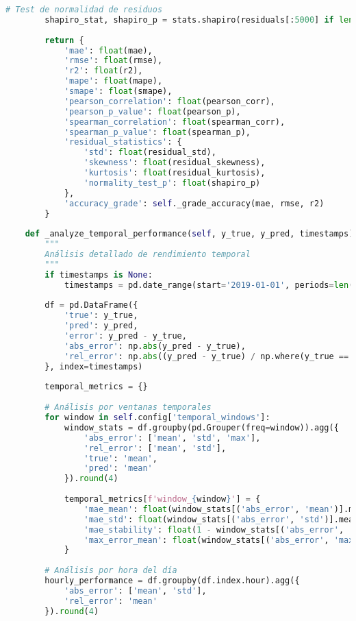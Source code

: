 \begin{lstlisting}[language=Python, caption=Framework integral de evaluación]
        # Test de normalidad de residuos
        shapiro_stat, shapiro_p = stats.shapiro(residuals[:5000] if len(residuals) > 5000 else residuals)
        
        return {
            'mae': float(mae),
            'rmse': float(rmse),
            'r2': float(r2),
            'mape': float(mape),
            'smape': float(smape),
            'pearson_correlation': float(pearson_corr),
            'pearson_p_value': float(pearson_p),
            'spearman_correlation': float(spearman_corr),
            'spearman_p_value': float(spearman_p),
            'residual_statistics': {
                'std': float(residual_std),
                'skewness': float(residual_skewness),
                'kurtosis': float(residual_kurtosis),
                'normality_test_p': float(shapiro_p)
            },
            'accuracy_grade': self._grade_accuracy(mae, rmse, r2)
        }
    
    def _analyze_temporal_performance(self, y_true, y_pred, timestamps):
        """
        Análisis detallado de rendimiento temporal
        """
        if timestamps is None:
            timestamps = pd.date_range(start='2019-01-01', periods=len(y_true), freq='6S')
        
        df = pd.DataFrame({
            'true': y_true,
            'pred': y_pred,
            'error': y_pred - y_true,
            'abs_error': np.abs(y_pred - y_true),
            'rel_error': np.abs((y_pred - y_true) / np.where(y_true == 0, 1, y_true))
        }, index=timestamps)
        
        temporal_metrics = {}
        
        # Análisis por ventanas temporales
        for window in self.config['temporal_windows']:
            window_stats = df.groupby(pd.Grouper(freq=window)).agg({
                'abs_error': ['mean', 'std', 'max'],
                'rel_error': ['mean', 'std'],
                'true': 'mean',
                'pred': 'mean'
            }).round(4)
            
            temporal_metrics[f'window_{window}'] = {
                'mae_mean': float(window_stats[('abs_error', 'mean')].mean()),
                'mae_std': float(window_stats[('abs_error', 'std')].mean()),
                'mae_stability': float(1 - window_stats[('abs_error', 'mean')].std() / window_stats[('abs_error', 'mean')].mean()),
                'max_error_mean': float(window_stats[('abs_error', 'max')].mean())
            }
        
        # Análisis por hora del día
        hourly_performance = df.groupby(df.index.hour).agg({
            'abs_error': ['mean', 'std'],
            'rel_error': 'mean'
        }).round(4)
        

\end{lstlisting}

